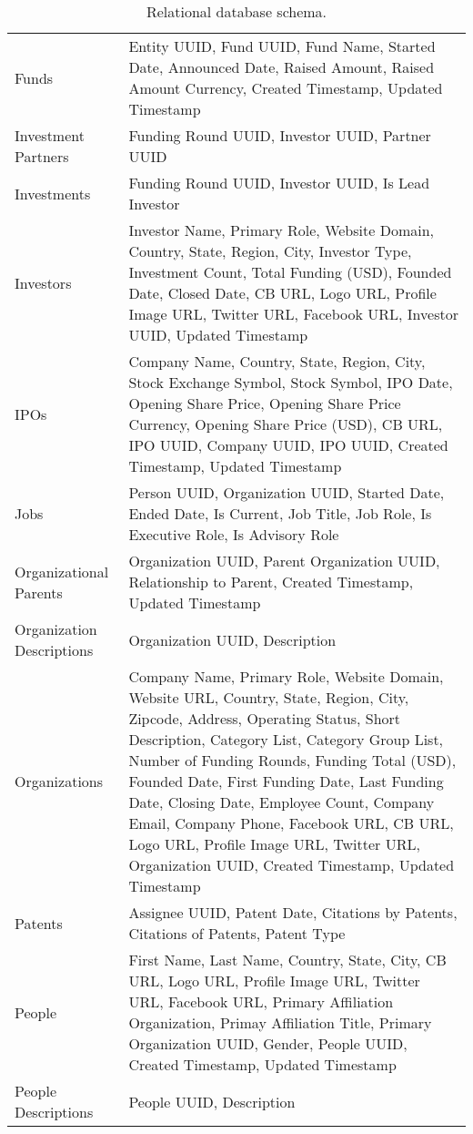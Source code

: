 \begin{table}[!htb]
{\begin{tabular}{p{3cm}p{10cm}}
Funds & Entity UUID, Fund UUID, Fund Name, Started Date, Announced Date, Raised Amount, Raised Amount Currency, Created Timestamp, Updated Timestamp \\
Investment Partners & Funding Round UUID, Investor UUID, Partner UUID \\
Investments & Funding Round UUID, Investor UUID, Is Lead Investor \\
Investors & Investor Name, Primary Role, Website Domain, Country, State, Region, City, Investor Type, Investment Count, Total Funding (USD), Founded Date, Closed Date, CB URL, Logo URL, Profile Image URL, Twitter URL, Facebook URL, Investor UUID, Updated Timestamp\\
IPOs & Company Name, Country, State, Region, City, Stock Exchange Symbol, Stock Symbol, IPO Date, Opening Share Price, Opening Share Price Currency, Opening Share Price (USD), CB URL, IPO UUID, Company UUID, IPO UUID, Created Timestamp, Updated Timestamp \\
Jobs & Person UUID, Organization UUID, Started Date, Ended Date, Is Current, Job Title, Job Role, Is Executive Role, Is Advisory Role \\
Organizational Parents & Organization UUID, Parent Organization UUID, Relationship to Parent, Created Timestamp, Updated Timestamp \\
Organization Descriptions & Organization UUID, Description \\
Organizations & Company Name, Primary Role, Website Domain, Website URL, Country, State, Region, City, Zipcode, Address, Operating Status, Short Description, Category List, Category Group List, Number of Funding Rounds, Funding Total (USD), Founded Date, First Funding Date, Last Funding Date, Closing Date, Employee Count, Company Email, Company Phone, Facebook URL, CB URL, Logo URL, Profile Image URL, Twitter URL, Organization UUID, Created Timestamp, Updated Timestamp \\
Patents & Assignee UUID, Patent Date, Citations by Patents, Citations of Patents, Patent Type \\
People & First Name, Last Name, Country, State, City, CB URL, Logo URL, Profile Image URL, Twitter URL, Facebook URL, Primary Affiliation Organization, Primay Affiliation Title, Primary Organization UUID, Gender, People UUID, Created Timestamp, Updated Timestamp \\
People Descriptions & People UUID, Description \\
\bottomrule \end{tabular}
    }
    \caption[Relational database schema]{Relational database schema.}
    \label{tab:design:database_schema}
\end{table}

